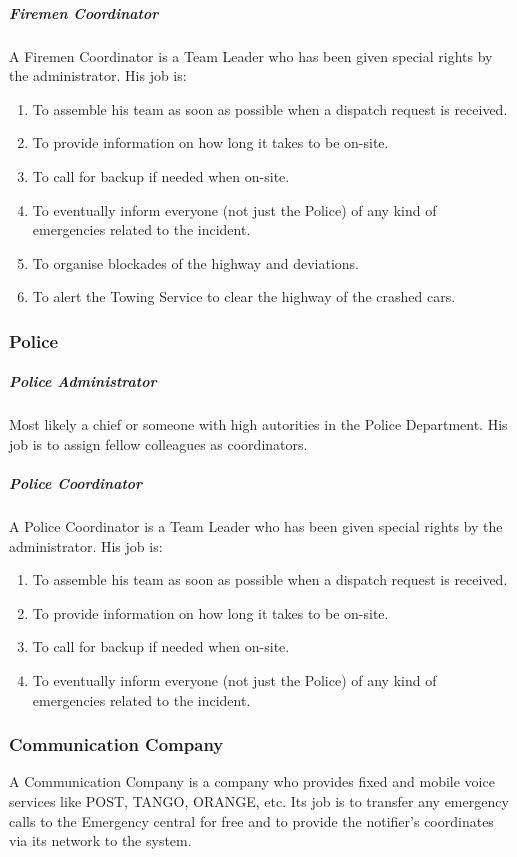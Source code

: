 \subparagraph{Firemen Coordinator}
A Firemen Coordinator is a Team Leader who has been given special
rights by the administrator. His job is:

\begin{enumerate}
\item To assemble his team as soon as possible when a dispatch request is
received.
\item To provide information on how long it takes to be on-site.
\item To call for backup if needed when on-site.
\item To eventually inform everyone (not just the Police) of any kind of
emergencies related to the incident.
\item To organise blockades of the highway and deviations.
\item To alert the Towing Service to clear the highway of the crashed cars.
\end{enumerate}

\subsubsection{Police}
\subparagraph{Police Administrator}
Most likely a chief or someone with high autorities in the Police Department.
His job is to assign fellow colleagues as coordinators.

\subparagraph{Police Coordinator}
A Police Coordinator is a Team Leader who has been given special
rights by the administrator. His job is:

\begin{enumerate}
\item To assemble his team as soon as possible when a dispatch request is
received.
\item To provide information on how long it takes to be on-site.
\item To call for backup if needed when on-site.
\item To eventually inform everyone (not just the Police) of any kind
of emergencies related to the incident.
\end{enumerate}


\subsubsection{Communication Company}
A Communication Company is a company who provides fixed and mobile voice
services like POST, TANGO, ORANGE, etc. Its job is to transfer any emergency
calls to the Emergency central for free and to provide the notifier's
coordinates via its network to the system.


